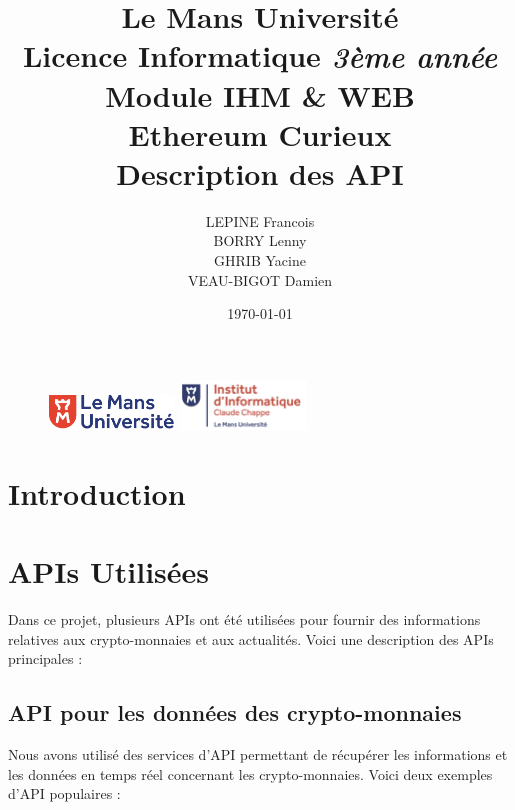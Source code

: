 \documentclass[a4paper,11pt]{article}
\begin{document}
\begin{figure}
\includegraphics[width=0.3\textwidth]{logolemansU.png}
\hspace{150pt} 
\includegraphics[width=0.3\textwidth]{logo_ic2.png} 
\end{figure}

\title{\textbf{\color{blue} Le Mans Universit\'e}\color{black}
\\ Licence Informatique \textit{3\`eme ann\'ee}
\\ Module IHM \& WEB
\\ Ethereum Curieux 
\\ \textbf{Description des API}} 
\author{LEPINE Francois\\BORRY Lenny\\GHRIB Yacine\\VEAU-BIGOT Damien}
\date{\today} 
\maketitle 
\newpage

\tableofcontents
\newpage

\section{Introduction}

\section{APIs Utilis\'ees}
Dans ce projet, plusieurs APIs ont été utilisées pour fournir des informations relatives aux crypto-monnaies et aux actualités. Voici une description des APIs principales :

\subsection{API pour les données des crypto-monnaies}
Nous avons utilisé des services d'API permettant de récupérer les informations et les données en temps réel concernant les crypto-monnaies. Voici deux exemples d'API populaires :
\end{document}
